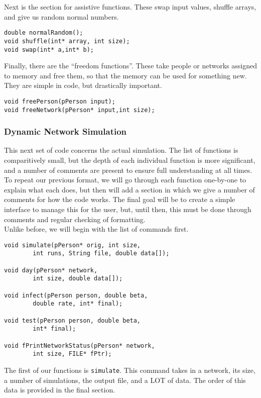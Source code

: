 \documentclass{article}
\numberwithin{equation}{section} %
\theoremstyle{definition}
\begin{document}
\begin{multicols*}{2}
Next is the section for assistive functions. These swap input values, shuffle arrays, and give us random normal numbers.
\begin{lstlisting}
double normalRandom();
void shuffle(int* array, int size);
void swap(int* a,int* b);
\end{lstlisting}

Finally, there are the ``freedom functions''. These take people or networks assigned to memory and free them, so that the memory can be used for something new. They are simple in code, but drastically important.
\begin{lstlisting}
void freePerson(pPerson input);
void freeNetwork(pPerson* input,int size);
\end{lstlisting}

\subsubsection{Dynamic Network Simulation}
This next set of code concerns the actual simulation. The list of functions is comparitively small, but the depth of each individual function is more significant, and a number of comments are present to ensure full understanding at all times. \\

To repeat our previous format, we will go through each function one-by-one to explain what each does, but then will add a section in which we give a number of comments for how the code works. The final goal will be to create a simple interface to manage this for the user, but, until then, this must be done through comments and regular checking of formatting. \\

Unlike before, we will begin with the list of commands first.
\begin{lstlisting}
void simulate(pPerson* orig, int size,
        int runs, String file, double data[]);

void day(pPerson* network,
        int size, double data[]);

void infect(pPerson person, double beta,
        double rate, int* final);

void test(pPerson person, double beta,
        int* final);

void fPrintNetworkStatus(pPerson* network,
        int size, FILE* fPtr);
\end{lstlisting}

The first of our functions is \lstinline{simulate}. This command takes in a network, its size, a number of simulations, the output file, and a LOT of data. The order of this data is provided in the final section. \\


\end{multicols*}
\end{document}
